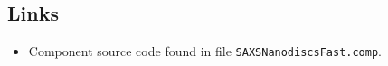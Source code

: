 \subsection*{Links}
\begin{itemize}
  \item Component source code found in file \texttt{SAXSNanodiscsFast.comp}.
\end{itemize}

